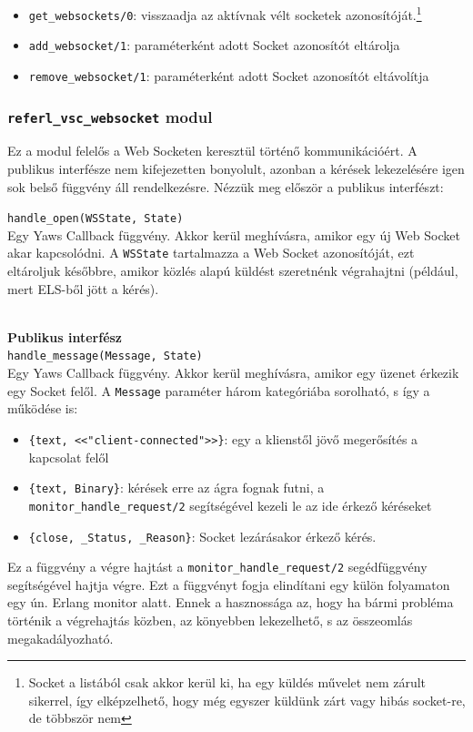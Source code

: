 \begin{itemize}
    \item \lstinline{get_websockets/0}: visszaadja az aktívnak vélt socketek azonosítóját.\footnote{Socket a listából csak akkor kerül ki, ha egy küldés művelet nem zárult sikerrel, így elképzelhető, hogy még egyszer küldünk zárt vagy hibás socket-re, de többször nem}
    \item \lstinline{add_websocket/1}: paraméterként adott Socket azonosítót eltárolja
    \item \lstinline{remove_websocket/1}: paraméterként adott Socket azonosítót eltávolítja
\end{itemize}



\subsubsection{\lstinline{referl_vsc_websocket} modul}

Ez a modul felelős a Web Socketen keresztül történő kommunikációért. A publikus interfésze nem kifejezetten bonyolult, azonban a kérések lekezelésére igen sok belső függvény áll rendelkezésre. Nézzük meg először a publikus interfészt:

\noindent \lstinline{handle_open(WSState, State)} \\
\noindent Egy Yaws Callback függvény. Akkor kerül meghívásra, amikor egy új Web Socket akar kapcsolódni. A \lstinline{WSState} tartalmazza a Web Socket azonosítóját, ezt eltároljuk későbbre, amikor közlés alapú küldést szeretnénk végrahajtni (például, mert ELS-ből jött a kérés).

\\
\vspace{14pt}
\noindent \textbf{Publikus interfész}
\\

\noindent \lstinline{handle_message(Message, State)} \\
\noindent Egy Yaws Callback függvény. Akkor kerül meghívásra, amikor egy üzenet érkezik egy Socket felől. A \lstinline{Message} paraméter három kategóriába sorolható, s így a működése is:
\begin{itemize}
    \item \lstinline|{text, <<"client-connected">>}|: egy a klienstől jövő megerősítés a kapcsolat felől
    \item \lstinline|{text, Binary}|: kérések erre az ágra fognak futni, a \lstinline{monitor_handle_request/2} segítségével kezeli le az ide érkező kéréseket
    \item \lstinline|{close, _Status, _Reason}|: Socket lezárásakor érkező kérés.
\end{itemize}
Ez a függvény a végre hajtást a \lstinline{monitor_handle_request/2} segédfüggvény segítségével hajtja végre. Ezt a függvényt fogja elindítani egy külön folyamaton egy ún. Erlang monitor alatt. Ennek a hasznossága az, hogy ha bármi probléma történik a végrehajtás közben, az könyebben lekezelhető, s az összeomlás megakadályozható.
\\



